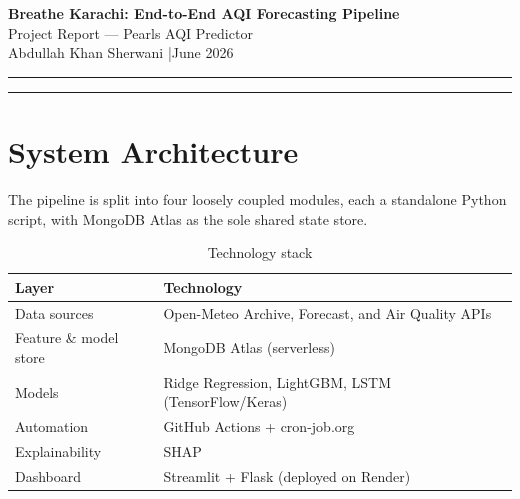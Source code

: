 \documentclass[11pt,a4paper]{article}
\begin{document}
\begin{center}
  {\LARGE\bfseries Breathe Karachi: End-to-End AQI Forecasting Pipeline}\\[6pt]
  {\large Project Report — Pearls AQI Predictor}\\[4pt]
  {\normalsize Abdullah Khan Sherwani \quad|\quad June 2026}
\end{center}

\hrule
\vspace{6pt}

\begin{abstract}
\noindent
Breathe Karachi is a fully serverless, end-to-end machine learning pipeline that
forecasts Karachi's US Air Quality Index (AQI) four days ahead. The system collects
raw weather and pollutant data hourly from public APIs, engineers 141 features per
day, retrains three ML models daily, and serves predictions through a Streamlit
dashboard—all without a persistent server. Three model families are trained and
evaluated — Ridge Regression, LightGBM, and LSTM — with the best-performing
model each run selected via rolling-origin cross-validation.
The live dashboard is available at \url{https://breathe-karachi.onrender.com}.
\end{abstract}

\vspace{4pt}
\hrule
\vspace{6pt}

\section{System Architecture}

The pipeline is split into four loosely coupled modules, each a standalone Python
script, with MongoDB Atlas as the sole shared state store.

\begin{table}[H]
\centering
\caption{Technology stack}
\begin{tabular}{ll}
\toprule
\textbf{Layer} & \textbf{Technology} \\
\midrule
Data sources      & Open-Meteo Archive, Forecast, and Air Quality APIs \\
Feature \& model store & MongoDB Atlas (serverless) \\
Models            & Ridge Regression, LightGBM, LSTM (TensorFlow/Keras) \\
Automation        & GitHub Actions + cron-job.org \\
Explainability    & SHAP \\
Dashboard         & Streamlit + Flask (deployed on Render) \\
\bottomrule
\end{tabular}
\end{table}
\end{document}
